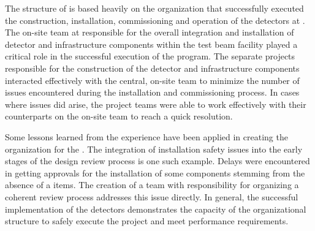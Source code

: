 The structure of  is based heavily on the
organization that successfully executed the construction,
installation, commissioning and operation of the 
detectors at .  The on-site team at  responsible for the
overall integration and installation of detector and infrastructure
components within the test beam facility played a critical role in the
successful execution of the  program.  The separate
projects responsible for the construction of the detector and
infrastructure components interacted effectively with the central,
on-site team to minimize the number of issues encountered during the
installation and commissioning process.  In cases where issues did
arise, the project teams were able to work effectively with their
counterparts on the on-site team to reach a quick resolution.

Some lessons learned from the  experience have been
applied in creating the  organization for the
 .  The integration of installation safety
issues into the early stages of the design review process is one such
example.  Delays were encountered in getting approvals for the
installation of some  components stemming from the absence
of a %
items.  The creation of a  team with responsibility for
organizing a coherent review process addresses this issue directly.
In general, the successful implementation of the 
detectors demonstrates the capacity of the organizational structure to
safely execute the project and meet performance requirements.
